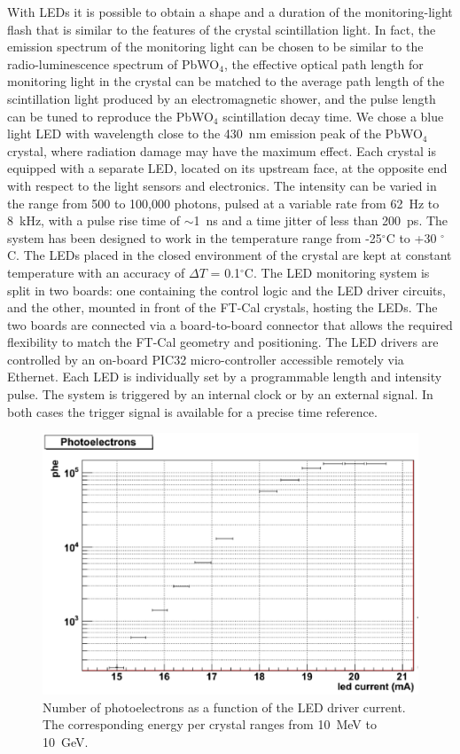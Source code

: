 With LEDs it is possible to obtain a shape and a duration of the monitoring-light flash that is similar to the features
of the crystal scintillation light. In fact, the emission spectrum of the monitoring light can be chosen to be similar to
the radio-luminescence spectrum of PbWO$_4$, the effective optical path length for monitoring light in the crystal
can be matched to the average path length of the scintillation light produced by an electromagnetic shower, and the
pulse length can be tuned to reproduce the PbWO$_4$ scintillation decay time. We chose a blue light LED with
wavelength close to the 430~nm emission peak of the PbWO$_4$ crystal, where radiation damage may have the
maximum effect. Each crystal is equipped with a separate LED, located on its upstream face, at the
opposite end with respect to the light sensors and electronics. The intensity can be varied in the range from 500 to
100,000 photons, pulsed at a variable rate from 62~Hz to 8~kHz, with a pulse rise time of $\sim$1~ns and a time
jitter of less than 200~ps. The system has been designed to work in the temperature range from -25$^\circ$C
to +30 $^\circ$C. The LEDs placed in the closed environment of the crystal are kept at constant temperature with an
accuracy of $\Delta T$ = 0.1$^\circ$C. The LED monitoring system is split in two boards: one containing the control
logic and the LED driver circuits, and the other, mounted in front of the FT-Cal crystals, hosting the LEDs. The two
boards are connected via a board-to-board connector that allows the required flexibility to match the FT-Cal
geometry and positioning. The LED drivers are controlled by an on-board PIC32 micro-controller accessible remotely
via Ethernet. Each LED is individually set by a programmable length and intensity pulse. The system is triggered by
an internal clock or by an external signal. In both cases the trigger signal is available for a precise time reference. 

\begin{figure}[th!]
\centering 
\includegraphics[width=1.0\columnwidth]{./fig/dynamics.eps}
\caption{Number of photoelectrons as a function of the LED driver current. The corresponding energy per crystal
  ranges from 10~MeV to 10~GeV.}
\label{fig:LEDperf1} 
\end{figure}

